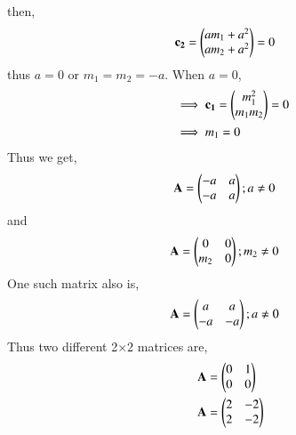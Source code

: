 \documentclass[journal,12pt,twocolumn]{IEEEtran}
\begin{document}
then, 
\begin{align}
    \mathbf{c_2} &= \begin{pmatrix}am_1+a^2\\am_2+a^2\end{pmatrix} = 0
\end{align}
thus $a=0$ or $m_1=m_2=-a$. When $a=0$, 
\begin{align}
    &\implies\mathbf{c_1} = \begin{pmatrix}m_1^2\\m_1m_2\end{pmatrix}=0\\
    &\implies m_1=0
\end{align}
Thus we get, 
\begin{align}
    \mathbf{A} &= \begin{pmatrix}-a&a\\-a&a\end{pmatrix} ; a\ne0
\end{align}
and 
\begin{align}
    \mathbf{A} &= \begin{pmatrix}0&0\\m_2&0\end{pmatrix} ; m_2\ne0
\end{align}
One such matrix also is, 
\begin{align}
    \mathbf{A} &= \begin{pmatrix}a&a\\-a&-a\end{pmatrix} ; a\ne0
\end{align}
Thus two different 2$\times2$ matrices are, 
\begin{align}
    \mathbf{A}&=\begin{pmatrix}0&1\\0&0\end{pmatrix}\\
    \mathbf{A}&=\begin{pmatrix}2&-2\\2&-2\end{pmatrix}
\end{align}
\end{document}
